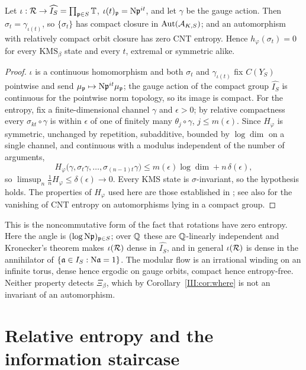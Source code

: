 \begin{theorem}\label{III:thm:cnt}
Let $\iota:\mathcal{R}\to\widehat{I_S}=\prod_{\mathfrak{p}\in S}\mathbb{T}$, $\iota(t)_{\mathfrak{p}}=\mathrm{N}\mathfrak{p}^{it}$, and let
$\gamma$ be the gauge action. Then $\sigma_t=\gamma_{\iota(t)}$, so $\{\sigma_t\}$ has
compact closure in $\operatorname{Aut}(\mathcal{A}_{K,S})$; and an automorphism with relatively compact orbit
closure has zero CNT entropy. Hence $h_\varphi(\sigma_t)=0$ for every $\mathrm{KMS}_\beta$
state and every $t$, extremal or symmetric alike.
\end{theorem}

\begin{proof}
$\iota$ is a continuous homomorphism and both $\sigma_t$ and $\gamma_{\iota(t)}$ fix
$C(Y_S)$ pointwise and send $\mu_{\mathfrak{p}}\mapsto\mathrm{N}\mathfrak{p}^{it}\mu_{\mathfrak{p}}$; the gauge action of the
compact group $\widehat{I_S}$ is continuous for the pointwise norm topology, so its image is
compact. For the entropy, fix a finite-dimensional channel $\gamma$ and $\epsilon>0$; by
relative compactness every $\sigma_{kt}\circ\gamma$ is within $\epsilon$ of one of finitely
many $\theta_j\circ\gamma$, $j\le m(\epsilon)$. Since $H_\varphi$ is symmetric, unchanged by
repetition, subadditive, bounded by $\log\dim$ on a single channel, and continuous with a
modulus independent of the number of arguments,
\[
H_\varphi\bigl(\gamma,\sigma_t\gamma,\dots,\sigma_{(n-1)t}\gamma\bigr)\le m(\epsilon)\log\dim+n\,\delta(\epsilon),
\]
so $\limsup_n\frac1nH_\varphi\le\delta(\epsilon)\to0$. Every KMS state is $\sigma$-invariant,
so the hypothesis holds. The properties of $H_\varphi$ used here are those established in
\cite{CNT}; see also \cite{OP} for the vanishing of $\mathrm{CNT}$ entropy on automorphisms
lying in a compact group.
\end{proof}

\begin{remark}\label{III:rem:rotation}
This is the noncommutative form of the fact that rotations have zero entropy. Here the
angle is $(\log\mathrm{N}\mathfrak{p})_{\mathfrak{p}\in S}$; over $\mathbb{Q}$ these are $\mathbb{Q}$-linearly independent and
Kronecker's theorem makes $\iota(\mathcal{R})$ dense in $\widehat{I_S}$, and in general $\iota(\mathcal{R})$
is dense in the annihilator of $\{\mathfrak{a}\in I_S:\mathrm{N}\mathfrak{a}=1\}$. The modular flow is an
irrational winding on an infinite torus, dense hence ergodic on gauge orbits, compact hence
entropy-free. Neither property detects
$\Xi_\beta$, which by Corollary~\ref{III:cor:where} is not an invariant of an automorphism.
\end{remark}

\section{Relative entropy and the information staircase}\label{III:sec:relent}

